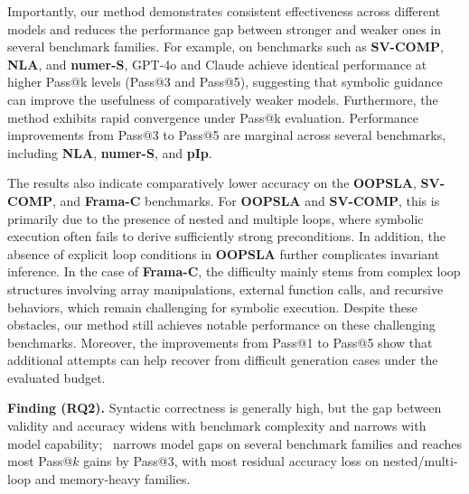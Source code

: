 \DIFaddbegin
Importantly, our method demonstrates consistent effectiveness across different models and reduces the performance gap between stronger and weaker ones in several benchmark families. For example, on benchmarks such as \textbf{SV-COMP}, \textbf{NLA}, and \textbf{numer-S}, GPT-4o and Claude achieve identical performance at higher Pass@k levels (Pass@3 and Pass@5), suggesting that symbolic guidance can improve the usefulness of comparatively weaker models. Furthermore, the method exhibits rapid convergence under Pass@k evaluation. Performance improvements from Pass@3 to Pass@5 are marginal across several benchmarks, including \textbf{NLA}, \textbf{numer-S}, and \textbf{pIp}.
\DIFaddend

The results also indicate comparatively lower accuracy on the \textbf{OOPSLA}, \textbf{SV-COMP}, and \textbf{Frama-C} benchmarks. For \textbf{OOPSLA} and \textbf{SV-COMP}, this is primarily due to the presence of nested and multiple loops, where symbolic execution often fails to derive sufficiently strong preconditions. In addition, the absence of explicit loop conditions in \textbf{OOPSLA} further complicates invariant inference. In the case of \textbf{Frama-C}, the difficulty mainly stems from complex loop structures involving array manipulations, external function calls, and recursive behaviors, which remain challenging for symbolic execution. Despite these obstacles, our method still achieves notable performance on these challenging benchmarks. Moreover, the improvements from Pass@1 to Pass@5 show that additional attempts can help recover from difficult generation cases under the evaluated budget.

\begin{finding}
\DIFaddbegin
\textbf{Finding (RQ2).} Syntactic correctness is generally high, but the gap between validity and accuracy widens with benchmark complexity and narrows with model capability; \toolname\ narrows model gaps on several benchmark families and reaches most Pass@$k$ gains by Pass@3, with most residual accuracy loss on nested/multi-loop and memory-heavy families.
\DIFaddend
\end{finding}
